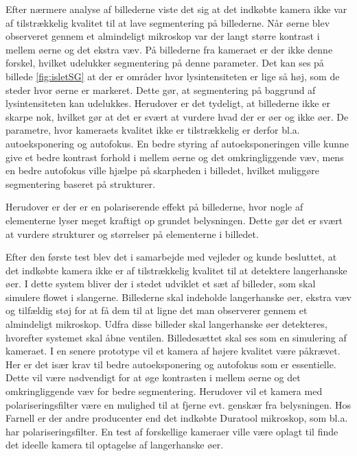 Efter nærmere analyse af billederne viste det sig at det indkøbte kamera ikke var af tilstrækkelig kvalitet til at lave segmentering på billederne. Når øerne blev observeret gennem et almindeligt mikroskop var der langt større kontrast i mellem øerne og det ekstra væv. På billederne fra kameraet er der ikke denne forskel, hvilket udelukker segmentering på denne parameter. Det kan ses på billede \ref{fig:isletSG} at der er områder hvor lysintensiteten er lige så høj, som de steder hvor øerne er markeret. Dette gør, at segmentering på baggrund af lysintensiteten kan udelukkes. Herudover er det tydeligt, at billederne ikke er skarpe nok, hvilket gør at det er svært at vurdere hvad der er øer og ikke øer. De parametre, hvor kameraets kvalitet ikke er tilstrækkelig er derfor bl.a. autoeksponering og autofokus. En bedre styring af autoeksponeringen ville kunne give et bedre kontrast forhold i mellem øerne og det omkringliggende væv, mens en bedre autofokus ville hjælpe på skarpheden i billedet, hvilket muliggøre segmentering baseret på strukturer.

Herudover er der er en polariserende effekt på billederne, hvor nogle af elementerne lyser meget kraftigt op grundet belysningen. Dette gør det er svært at vurdere strukturer og størrelser på elementerne i billedet. 

Efter den første test blev det i samarbejde med vejleder og kunde besluttet, at det indkøbte kamera ikke er af tilstrækkelig kvalitet til at detektere langerhanske øer. I dette system bliver der i stedet udviklet et sæt af billeder, som skal simulere flowet i slangerne. Billederne skal indeholde langerhanske øer, ekstra væv og tilfældig støj for at få dem til at ligne det man observerer gennem et almindeligt mikroskop. Udfra disse billeder skal langerhanske øer detekteres, hvorefter systemet skal åbne ventilen. Billedesættet skal ses som en simulering af kameraet. I en senere prototype vil et kamera af højere kvalitet være påkrævet. Her er det især krav til bedre autoeksponering og autofokus som er essentielle. Dette vil være nødvendigt for at øge kontrasten i mellem øerne og det omkringliggende væv for bedre segmentering. Herudover vil et kamera med polariseringsfilter være en mulighed til at fjerne evt. genskær fra belysningen. Hos Farnell er der andre producenter end det indkøbte Duratool mikroskop, som bl.a. har polariseringsfilter. En test af forskellige kameraer ville være oplagt til finde det ideelle kamera til optagelse af langerhanske øer. 